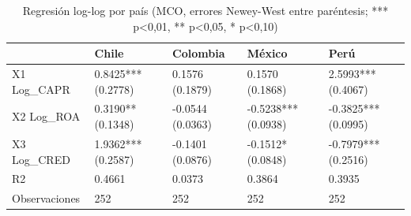 \begin{table}[htbp]
\centering
\caption{Regresión log-log por país (MCO, errores Newey-West entre paréntesis; *** p<0,01, ** p<0,05, * p<0,10)}
\begin{tabular}{lllll}
\hline
 & Chile & Colombia & México & Perú \\
\hline
X1 Log\_CAPR & 0.8425*** (0.2778) & 0.1576 (0.1879) & 0.1570 (0.1868) & 2.5993*** (0.4067) \\
X2 Log\_ROA & 0.3190** (0.1348) & -0.0544 (0.0363) & -0.5238*** (0.0938) & -0.3825*** (0.0995) \\
X3 Log\_CRED & 1.9362*** (0.2587) & -0.1401 (0.0876) & -0.1512* (0.0848) & -0.7979*** (0.2516) \\
R2 & 0.4661 & 0.0373 & 0.3864 & 0.3935 \\
Observaciones & 252 & 252 & 252 & 252 \\
\hline
\end{tabular}
\label{tab:tabla9_modelos_por_pais}
\end{table}